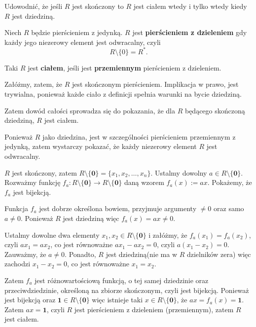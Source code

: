 \begin{problem}[9]
	Udowodnić, że jeśli $R$ jest skończony to $R$ jest ciałem wtedy i tylko wtedy kiedy $R$ jest dziedziną.
\end{problem} 
\begin{solution}
	\begin{note}
		
		Niech $R$ będzie pierścieniem z jedynką. $R$ jest \textbf{pierścieniem z dzieleniem} gdy każdy jego niezerowy element jest odwracalny, czyli \[
		R\setminus \{0\} = R^{\ast} 
		.\]  	

		Taki  $R$ jest \textbf{ciałem}, jeśli jest \textbf{przemiennym} pierścieniem z dzieleniem.  
	\end{note}

	Załóżmy, zatem, że $R$ jest skończonym pierścieniem. Implikacja w prawo, jest trywialna, ponieważ każde ciało z definicji spełnia warunki na bycie dziedziną. 

\noindent Zatem dowód całości sprowadza się do pokazania, że dla $R$ będącego skończoną dziedziną, $R$ jest ciałem. 

	Ponieważ  $R$ jako dziedzina, jest w szczególności pierścieniem przemiennym z jedynką, zatem wystarczy pokazać, że każdy niezerowy element $R$ jest odwracalny. 

	$R$ jest skończony, zatem $R\setminus \{\mathbf{0}\} = \{x_1,x_2,\ldots,x_{n}\} $. Ustalmy dowolny $a \in R\setminus \{\mathbf{0}\} $. Rozważmy funkcję $f_{a}: R\setminus \{\mathbf{0}\} \to R\setminus \{\mathbf{0}\} $ daną wzorem $f_{a}\left( x \right) := ax$. Pokażemy, że $f_{a}$ jest bijekcją.

	Funkcja  $f_{a}$ jest dobrze określona bowiem, przyjmuje argumenty $\neq 0$ oraz samo $a \neq 0$. Ponieważ $R$ jest dziedziną więc $f_{a}\left( x \right) = ax \neq 0$.

	Ustalmy dowolne dwa elementy $x_1, x_2 \in R\setminus \{\mathbf{0}\} $ i załóżmy, że $f_{a}\left( x_1 \right) = f_{a}\left( x_2 \right) $, czyli $ax_1 = ax_2$, co jest równoważne $ax_1 - ax_2 = 0$, czyli $a\left( x_1-x_2 \right) = 0$. Zauważmy, że $a\neq 0$. Ponadto, $R$ jest dziedziną(nie ma w $R$ dzielników zera) więc zachodzi $x_1-x_2 = 0$, co jest równoważne $x_1=x_2$. 

	Zatem $f_{a}$ jest różnowartościową funkcją, o tej samej dziedzinie oraz przeciwdziedzinie, określoną na zbiorze skończonym, czyli jest bijekcją. Ponieważ jest bijekcją oraz $\mathbf{1} \in R\setminus \{\mathbf{0}\} $ więc istnieje taki $x \in R\setminus \{\mathbf{0}\} $, że $ax = f_{a}\left( x \right) = \mathbf{1}$. Zatem $ax = \mathbf{1}$, czyli $R$ jest pierścieniem z dzieleniem (przemiennym), zatem $R$ jest ciałem. 
\end{solution} 
